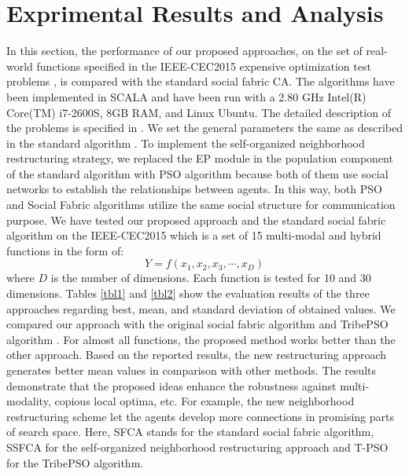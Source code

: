 \documentclass{llncs}
\begin{document}
\section{Exprimental Results and Analysis}
In this section, the performance of our proposed approaches, on the set of real-world functions specified in the IEEE-CEC2015 expensive optimization test problems \cite{chen2014problem}, is compared with the standard social fabric CA. The algorithms have been implemented in SCALA and have been run with a 2.80 GHz Intel(R) Core(TM) i7-2600S, 8GB RAM, and Linux Ubuntu. The detailed description of the problems is specified in \cite{chen2014problem}. \newline
We set the general parameters the same as described in the standard algorithm \cite{ali2016leveraged}. To implement the self-organized neighborhood restructuring strategy, we replaced the EP module in the population component of the standard algorithm with PSO algorithm because both of them use social networks to establish the relationships between agents. In this way, both PSO and Social Fabric algorithms utilize the same social structure for communication purpose. \newline
We have tested our proposed approach and the standard social fabric algorithm on the IEEE-CEC2015 which is a set of 15 multi-modal and hybrid functions in the form of: 
\begin{equation}
	Y=f(x_{1}, x_{2}, x_{3}, \cdots, x_{D})
\end{equation}
where $D$ is the number of dimensions.\newline
Each function is tested for 10 and 30 dimensions. Tables \ref{tbl1} and \ref{tbl2} show the evaluation results of the three approaches regarding best, mean, and standard deviation of obtained values. We compared our approach with the original social fabric algorithm and TribePSO algorithm \cite{chen2006tribe}. For almost all functions, the proposed method works better than the other approach. Based on the reported results, the new restructuring approach generates better mean values in comparison with other methods. 
The results demonstrate that the proposed ideas enhance the robustness against multi-modality, copious local optima, etc. For example, the new neighborhood restructuring scheme let the agents develop more connections in promising parts of search space. Here, SFCA stands for the standard social fabric algorithm, SSFCA for the self-organized neighborhood restructuring approach and T-PSO for the TribePSO algorithm.
\end{document}

